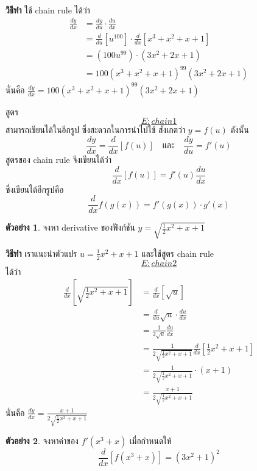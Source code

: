 \documentclass[
]{book}
\theoremstyle{definition}
\theoremstyle{definition}
\newtheorem{example}{ตัวอย่าง}[chapter]
\theoremstyle{definition}
\theoremstyle{definition}
\theoremstyle{remark}
\begin{document}
\textbf{วิธีทำ} ใช้ chain rule ได้ว่า \begin{equation}   \begin{aligned}
    \frac{dy}{dx}
    &= \frac{dy}{du} \cdot \frac{du}{dx} \\
    &= \frac{d}{du}[u^{100}] \cdot \frac{d}{dx}[x^3+x^2+x+1] \\
    &= (100u^{99}) \cdot (3x^2+2x+1) \\
    &= 100(x^3+x^2+x+1)^{99}(3x^2+2x+1)
  \end{aligned} \end{equation} นั่นคือ
\(\displaystyle \frac{dy}{dx} = 100(x^3+x^2+x+1)^{99}(3x^2+2x+1)\)

สูตร~\hyperref[E:chain1]{\[E:chain1\]} สามารถเขียนได้ในอีกรูป ซึ่งสะดวกในการนำไปใช้ สังเกตว่า
\(y = f(u)\) ดังนั้น
\[\frac{dy}{dx} = \frac{d}{dx}[f(u)] \quad \text{และ} \quad
    \frac{dy}{du} = f'(u)\] สูตรของ chain rule จึงเขียนได้ว่า
\[\label{E:chain2}
\boxed{
    \frac{d}{dx}[f(u)] = f'(u)\frac{du}{dx}
}\] ซึ่งเขียนได้อีกรูปคือ \[\frac{d}{dx} f(g(x)) = f'(g(x))\cdot g'(x)\]

\begin{example}
จงหา derivative ของฟังก์ชัน \(y = \sqrt{\frac{1}{2}x^2+x+1}\)
\end{example}

\textbf{วิธีทำ} เราแนะนำตัวแปร \(u = \frac{1}{2}x^2+x+1\) และใช้สูตร chain
rule~\hyperref[E:chain2]{\[E:chain2\]} ได้ว่า \begin{equation}   \begin{aligned}
    \frac{d}{dx} \left[\sqrt{\frac{1}{2}x^2+x+1} \right]
    &= \frac{d}{dx}[\sqrt{u}] \\
    &= \frac{d}{du}\sqrt{u} \cdot \frac{du}{dx} \\
    &= \frac{1}{2\sqrt{u}} \frac{du}{dx} \\
    &= \frac{1}{2\sqrt{\frac{1}{2}x^2+x+1}} \frac{d}{dx}
\left[\frac{1}{2}x^2+x+1\right] \\
    &= \frac{1}{2\sqrt{\frac{1}{2}x^2+x+1}} \cdot (x+1) \\
    &= \frac{x+1}{2\sqrt{\frac{1}{2}x^2+x+1}}
  \end{aligned} \end{equation} นั่นคือ
\(\displaystyle \frac{dy}{dx} = \frac{x+1}{2\sqrt{\frac{1}{2}x^2+x+1}}\)

\begin{example}
จงหาค่าของ \(f'(x^3+x)\) เมื่อกำหนดให้ \[\frac{d}{dx}[f(x^3+x)] = (3x^2+1)^2\]
\end{example}
\end{document}
